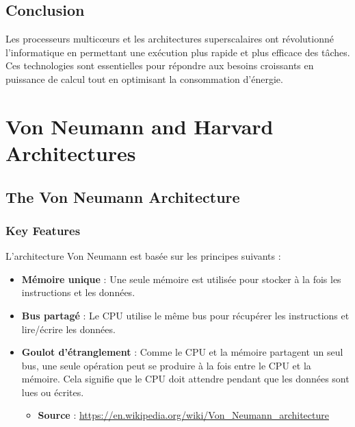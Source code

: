 \documentclass[10pt,a4paper]{article}
\begin{document}
\subsection*{Conclusion}

Les processeurs multicœurs et les architectures superscalaires ont révolutionné l'informatique en permettant une exécution plus rapide et plus efficace des tâches. Ces technologies sont essentielles pour répondre aux besoins croissants en puissance de calcul tout en optimisant la consommation d'énergie.

\section*{Von Neumann and Harvard Architectures}

\subsection*{The Von Neumann Architecture}

\subsubsection*{Key Features}
L'architecture Von Neumann est basée sur les principes suivants :
\begin{itemize}
    \item \textbf{Mémoire unique} : Une seule mémoire est utilisée pour stocker à la fois les instructions et les données.
    \item \textbf{Bus partagé} : Le CPU utilise le même bus pour récupérer les instructions et lire/écrire les données.
    \item \textbf{Goulot d'étranglement} : Comme le CPU et la mémoire partagent un seul bus, une seule opération peut se produire à la fois entre le CPU et la mémoire. Cela signifie que le CPU doit attendre pendant que les données sont lues ou écrites.
    \begin{itemize}
        \item \textbf{Source} : \url{https://en.wikipedia.org/wiki/Von_Neumann_architecture}
    \end{itemize}
\end{itemize}
\end{document}
